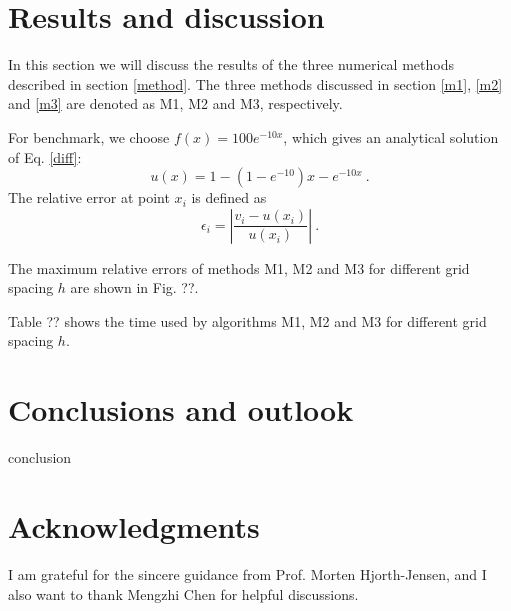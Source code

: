\documentclass{article}
\begin{document}
	\section{Results and discussion}\label{result}
	In this section we will discuss the results of the three numerical methods described in section \ref{method}. 
	The three methods discussed in section \ref{m1}, \ref{m2} and \ref{m3} are denoted as M1, M2 and M3, respectively.  
	
	For benchmark, we choose $f(x)=100 e^{-10x}$, which gives an analytical
	solution of Eq. \ref{diff}: 
	\begin{equation}
	u(x)=1-\left(1-e^{-10}\right)x-e^{-10x}\ .
	\end{equation}
	The relative error at point $x_i$ is defined as 
	\begin{equation}
	\epsilon_i=\left| \frac{v_i-u(x_i)}{u(x_i)}\right|\ .
	\end{equation}
	\par
	The maximum relative errors of methods M1, M2 and M3 for different grid spacing $h$ are shown in Fig. ??. 
	\par
	Table ?? shows the time used by algorithms M1, M2 and M3 for different grid spacing $h$.  
	
	\section{Conclusions and outlook}\label{conclude}
	conclusion
	
	\section*{Acknowledgments}
	I am grateful for the sincere guidance from Prof. Morten Hjorth-Jensen, and
	I also want to thank Mengzhi Chen for helpful discussions. 
	
	\nocite{*} 
	
	
\end{document}
